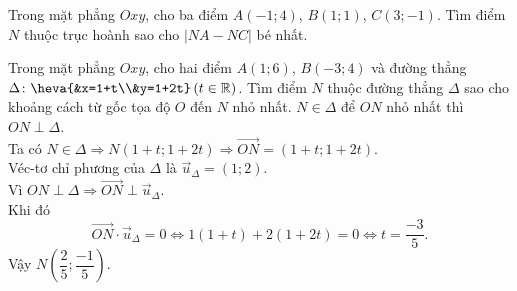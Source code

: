 \begin{bt}%
	Trong mặt phẳng $Oxy$, cho ba điểm $A(-1;4)$, $B(1;1)$, $C(3;-1)$. Tìm điểm $N$ thuộc trục hoành sao cho $|NA-NC|$ bé nhất.
\end{bt}
\begin{bt}%
	Trong mặt phẳng $Oxy$, cho hai điểm $A(1;6)$, $B(-3;4)$ và đường thẳng $\Delta\colon\heva{&x=1+t\\&y=1+2t}\, (t\in\mathbb{R})$. Tìm điểm $N$ thuộc đường thẳng $\Delta$ sao cho khoảng cách từ gốc tọa độ $O$ đến $N$ nhỏ nhất.
	\loigiai 
	{
		$N \in \Delta$ để $ON$ nhỏ nhất thì $ON \perp \Delta$.\\
		Ta có $N \in \Delta \Rightarrow N(1+t;1+2t)\Rightarrow \overrightarrow{ON}=(1+t;1+2t)$.\\	
		Véc-tơ chỉ phương của $\Delta$ là $\overrightarrow{u}_{\Delta}=(1;2)$.\\
		Vì $ON \perp \Delta \Rightarrow \overrightarrow{ON} \perp \overrightarrow{u}_{\Delta}$.\\
		Khi đó
		$$
		\overrightarrow{ON} \cdot \overrightarrow{u}_{\Delta}=0 \Leftrightarrow 1(1+t)+2(1+2 t)=0 \Leftrightarrow t=\frac{-3}{5}.
		$$
		Vậy $N\left(\dfrac{2}{5};\dfrac{-1}{5}\right)$.
	}
\end{bt}
